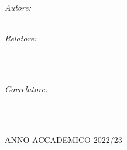 \begin{titlepage}
\begin{center}
    \begin{minipage}[t]{0.49\textwidth}
    \begin{flushleft} \large
    \emph{Autore:}\\
    \spacedlowsmallcaps{\myName}\\
    \end{flushleft}
    \end{minipage}
    \begin{minipage}[t]{0.49\textwidth}
    \begin{flushright} \large
    \emph{Relatore:} \\
    \\
    \end{flushright}
    \end{minipage}\\[0.5cm]
    \begin{minipage}[t]{0.99\textwidth}
    \begin{flushright} \large
    \emph{Correlatore:} \\
    \\
    \end{flushright}
    \end{minipage}\\[3cm]

    \vfill

    ANNO ACCADEMICO 2022/23

  \end{center}
\end{titlepage}
